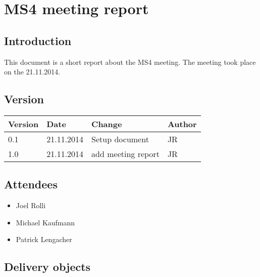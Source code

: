 
\chapter{MS4 meeting report} %

\label{ms4report} %



\section{Introduction}

This document is a short report about the MS4 meeting. The meeting took place on the 21.11.2014.

\section{Version}


\begin{tabular}{| p{1.5cm} | p{2cm} | p{9cm} | p{1.5cm} |}
    \hline
    Version 	& Date      		& Change & Author 								\\ \hline
    0.1    		& 21.11.2014        & Setup document        				& JR 	\\ \hline
    1.0 		& 21.11.2014 		& add meeting report 					& JR 	\\ \hline
\end{tabular}


\section{Attendees}
\begin{itemize}
\item Joel Rolli
\item Michael Kaufmann
\item Patrick Lengacher
\end{itemize}

\section{Delivery objects}

